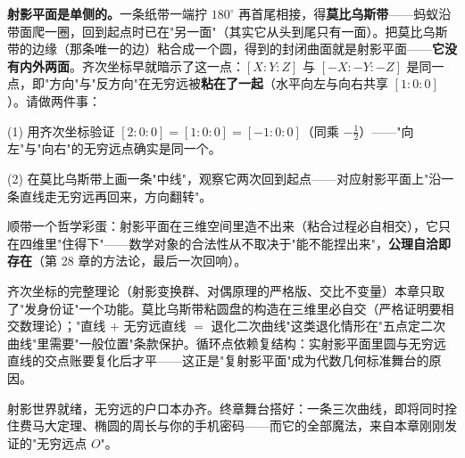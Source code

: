 \begin{shaonao}
\textbf{射影平面是单侧的。}一条纸带一端拧 $180^\circ$ 再首尾相接，得\textbf{莫比乌斯带}——蚂蚁沿带面爬一圈，回到起点时已在"另一面"（其实它从头到尾只有一面）。把莫比乌斯带的边缘（那条唯一的边）粘合成一个圆，得到的封闭曲面就是射影平面——\textbf{它没有内外两面}。齐次坐标早就暗示了这一点：$[X:Y:Z]$ 与 $[-X:-Y:-Z]$ 是同一点，即"方向"与"反方向"在无穷远被\textbf{粘在了一起}（水平向左与向右共享 $[1:0:0]$）。请做两件事：

(1) 用齐次坐标验证 $[2:0:0] = [1:0:0] = [-1:0:0]$（同乘 $-\tfrac12$）——"向左"与"向右"的无穷远点确实是同一个。

(2) 在莫比乌斯带上画一条"中线"，观察它两次回到起点——对应射影平面上"沿一条直线走无穷远再回来，方向翻转"。

顺带一个哲学彩蛋：射影平面在三维空间里造不出来（粘合过程必自相交），它只在四维里"住得下"——数学对象的合法性从不取决于"能不能捏出来"，\textbf{公理自洽即存在}（第 28 章的方法论，最后一次回响）。
\end{shaonao}

\begin{chengshi}
齐次坐标的完整理论（射影变换群、对偶原理的严格版、交比不变量）本章只取了"发身份证"一个功能。莫比乌斯带粘圆盘的构造在三维里必自交（严格证明要相交数理论）；"直线 $+$ 无穷远直线 $=$ 退化二次曲线"这类退化情形在"五点定二次曲线"里需要"一般位置"条款保护。循环点依赖复结构：实射影平面里圆与无穷远直线的交点账要复化后才平——这正是"复射影平面"成为代数几何标准舞台的原因。
\end{chengshi}

射影世界就绪，无穷远的户口本办齐。终章舞台搭好：一条三次曲线，即将同时拴住费马大定理、椭圆的周长与你的手机密码——而它的全部魔法，来自本章刚刚发证的"无穷远点 $O$"。
